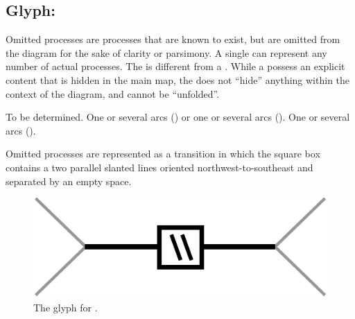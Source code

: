 \subsection{Glyph: }\label{sec:omitted}

Omitted processes are processes that are known to exist, but are omitted from the diagram for the sake of clarity or parsimony. A single  can represent any number of actual processes. The  is different from a . While a  possess an explicit content that is hidden in the main map, the  does not ``hide'' anything within the context of the diagram, and cannot be ``unfolded''.

\begin{glyphDescription}
 \glyphSboTerm To be determined.
 \glyphOrigin One or several  arcs () or one or several  arcs ().
 \glyphTarget One or several  arcs ().

 \glyphNode Omitted processes are represented as a transition in which the square box contains a two parallel slanted lines oriented northwest-to-southeast and separated by an empty space.
 \end{glyphDescription}

\begin{figure}[H]
  \centering
  \includegraphics[scale = 0.5]{images/omitted}
  \caption{The \PD glyph for .}
  \label{fig:omitted}
\end{figure}



